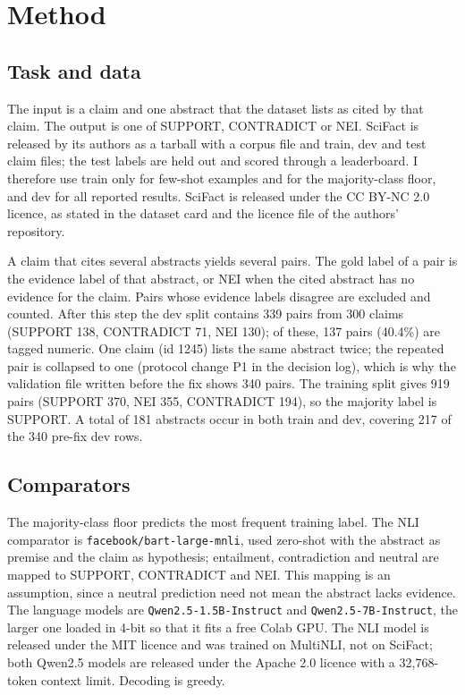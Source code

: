\documentclass[conference]{IEEEtran}
\begin{document}
\section{Method}
\subsection{Task and data}
The input is a claim and one abstract that the dataset lists as cited by that claim. The output is one of SUPPORT, CONTRADICT or NEI. SciFact is released by its authors as a tarball with a corpus file and train, dev and test claim files; the test labels are held out and scored through a leaderboard. I therefore use train only for few-shot examples and for the majority-class floor, and dev for all reported results. SciFact is released under the CC BY-NC 2.0 licence, as stated in the dataset card and the licence file of the authors' repository.

A claim that cites several abstracts yields several pairs. The gold label of a pair is the evidence label of that abstract, or NEI when the cited abstract has no evidence for the claim. Pairs whose evidence labels disagree are excluded and counted. After this step the dev split contains 339 pairs from 300 claims (SUPPORT 138, CONTRADICT 71, NEI 130); of these, 137 pairs (40.4\%) are tagged numeric. One claim (id 1245) lists the same abstract twice; the repeated pair is collapsed to one (protocol change P1 in the decision log), which is why the validation file written before the fix shows 340 pairs. The training split gives 919 pairs (SUPPORT 370, NEI 355, CONTRADICT 194), so the majority label is SUPPORT. A total of 181 abstracts occur in both train and dev, covering 217 of the 340 pre-fix dev rows.

\subsection{Comparators}
The majority-class floor predicts the most frequent training label. The NLI comparator is \texttt{facebook/bart-large-mnli}, used zero-shot with the abstract as premise and the claim as hypothesis; entailment, contradiction and neutral are mapped to SUPPORT, CONTRADICT and NEI. This mapping is an assumption, since a neutral prediction need not mean the abstract lacks evidence. The language models are \texttt{Qwen2.5-1.5B-Instruct} and \texttt{Qwen2.5-7B-Instruct}, the larger one loaded in 4-bit so that it fits a free Colab GPU. The NLI model is released under the MIT licence and was trained on MultiNLI, not on SciFact; both Qwen2.5 models are released under the Apache 2.0 licence with a 32{,}768-token context limit. Decoding is greedy.
\end{document}
